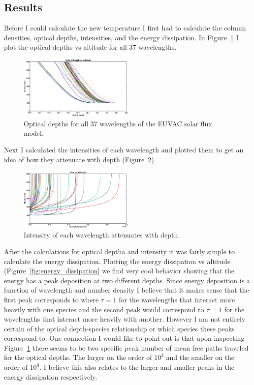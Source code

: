 \documentclass[10pt]{article}
\begin{document}
\begin{multicols}{2}
\section{Results}
Before I could calculate the new temperature I first had to calculate the column densities, optical depths, intensities, and the energy dissipation. In Figure~\ref{fig:optical_depths} I plot the optical depths vs altitude for all 37 wavelengths.   
\begin{figure}[H]
	\centering
		\includegraphics[width=0.5\textwidth]{./Figures/Optical_Depth_vs_Altitude.eps}
	\caption{Optical depths for all 37 wavelengths of the EUVAC solar flux model.}
	\label{fig:optical_depths}
\end{figure}
Next I calculated the intensities of each wavelength and plotted them to get an idea of how they attenuate with depth (Figure~\ref{fig:intensities}).
\begin{figure}[H]
	\centering
		\includegraphics[width=0.5\textwidth]{./Figures/Flux_vs_Altitude.eps}
	\caption{Intensity of each wavelength attenuates with depth.}
	\label{fig:intensities}
\end{figure}
After the calculations for optical deptha and intensity it was fairly simple to calculate the energy dissipation. Plotting the energy dissipation vs altitude (Figure~\ref{fig:energy_dissipation} we find very cool behavior showing that the energy has a peak deposition at two different depths. Since energy deposition is a function of wavelength and number density I believe that it makes sense that the first peak corresponds to where $\tau=1$ for the wavelengths that interact more heavily with one species and the second peak would correspond to $\tau=1$ for the wavelengths that interact more heavily with another. However I am not entirely certain of the optical depth-species relationship or which species these peaks correspond to. One connection I would like to point out is that upon inspecting Figure~\ref{fig:optical_depths} there seems to be two specific peak number of mean free paths traveled for the optical depths. The larger on the order of $10^2$ and the smaller on the order of $10^0$. I believe this also relates to the larger and smaller peaks in the energy dissipation respectively.

\end{multicols}
\end{document}
